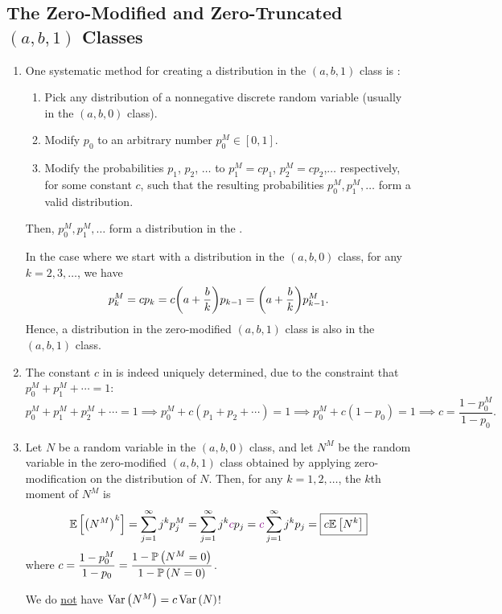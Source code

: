 \subsection{The Zero-Modified and Zero-Truncated \((a,b,1)\) Classes}
\begin{enumerate}
\item \label{it:zero-modify-process} One systematic method for creating a
distribution in the \((a,b,1)\) class is :
\begin{enumerate}[label={(\arabic*)}]
\item Pick any distribution of a nonnegative discrete random variable (usually
in the \((a,b,0)\) class).
\item Modify \(p_0\) to an arbitrary number \(p_0^{M}\in [0,1]\).
\item Modify the probabilities \(p_1\), \(p_2\), \(\dotsc\) to \(p_1^M=cp_1\),
\(p_2^M=cp_2\),\(\dotsc\) respectively, for some constant \(c\), such that the
resulting probabilities \(p_0^{M},p_1^{M},\dotsc\) form a valid distribution.
\end{enumerate}
Then, \(p_0^M,p_1^M,\dotsc\) form a distribution in the .

In the case where we start with a distribution in the \((a,b,0)\) class, for
any \(k=2,3,\dotsc\), we have
\[
p_k^{M}=cp_k=c\qty(a+\frac{b}{k})p_{k-1}
=\qty(a+\frac{b}{k})p_{k-1}^{M}.
\]
Hence, a distribution in the zero-modified \((a,b,1)\) class is also in the
\((a,b,1)\) class.
\item \label{it:zm-const-c-fmla}
The constant \(c\) in  is indeed
uniquely determined, due to the constraint that \(p_0^M+p_1^M+\dotsb=1\):
\[
p_0^M+p_1^M+p_2^M+\dotsb=1
\implies
p_0^M+c(p_1+p_2+\dotsb)=1
\implies
p_0^M+c(1-p_0)=1
\implies
c=\boxed{\frac{1-p_0^M}{1-p_0}}.
\]
\item \label{it:zm-kth-moment}
Let \(N\) be a random variable in the \((a,b,0)\) class, and let \(N^M\) be
the random variable in the zero-modified \((a,b,1)\) class obtained by applying
zero-modification on the distribution of \(N\). Then, for any \(k=1,2,\dotsc\), the
\(k\)th moment of \(N^M\) is
\[
\mathbb{E}\left[\qty(N^M)^{k}\right]=\sum_{j=1}^{\infty}j^kp_j^M 
=\sum_{j=1}^{\infty}j^k {\color{violet}c}p_j
={\color{violet}c}\sum_{j=1}^{\infty}j^k p_j
=\boxed{c\mathbb{E}\left[N^k\right]}
\]
where \(\displaystyle c=\frac{1-p_0^M}{1-p_0}=\frac{1-\mathbb{P}\left(N^M=0\right)}{1-\mathbb{P}\left(N=0\right)}\).

\begin{warning}
We do \underline{not} have \(\operatorname{Var}\left(N^M\right)=c\operatorname{Var}\left(N\right)\)!
\end{warning}


\end{enumerate}
